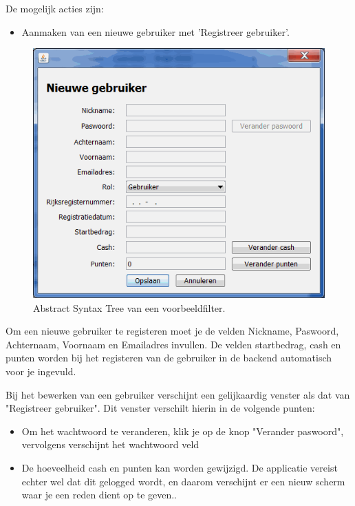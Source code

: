 De mogelijk acties zijn:
\begin{itemize}
\item{Aanmaken van een nieuwe gebruiker met 'Registreer gebruiker'.}
\end{itemize}

\begin{figure}[h!]
	\centering
		\includegraphics[width=\textwidth]{images/handleiding/handleiding4.png}
	\caption{Abstract Syntax Tree van een voorbeeldfilter.}
\end{figure}

Om een nieuwe gebruiker te registeren moet je de velden Nickname, Paswoord, Achternaam, Voornaam en Emailadres invullen. 
De velden startbedrag, cash en punten worden bij het registeren van de gebruiker in de backend automatisch voor je ingevuld.

Bij het bewerken van een gebruiker verschijnt een gelijkaardig venster als dat van "Registreer gebruiker".
Dit venster verschilt hierin in de volgende punten:

\begin{itemize}
\item{Om het wachtwoord te veranderen, klik je op de knop "Verander paswoord", vervolgens verschijnt het wachtwoord veld}
\item{De hoeveelheid cash en punten kan worden gewijzigd. De applicatie vereist echter wel dat dit gelogged wordt, en daarom verschijnt er een nieuw scherm waar je een reden dient op te geven..}
\end{itemize}

